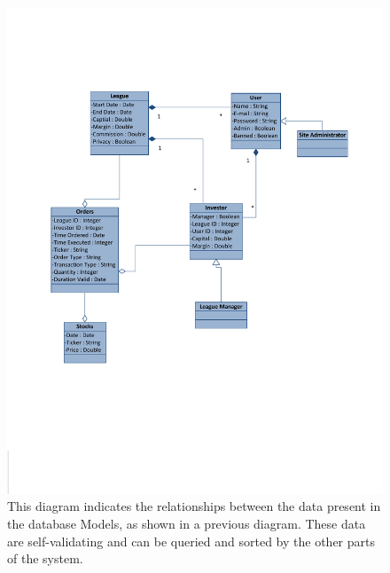 \begin{figure}
\label{domainModel}
\centering
\includegraphics[width=6.5in]{./img/domainModel.pdf}
\caption{This diagram indicates the relationships between the data present in the database Models, as shown in a previous diagram. These data are self-validating and can be queried and sorted by the other parts of the system.}
\end{figure}

